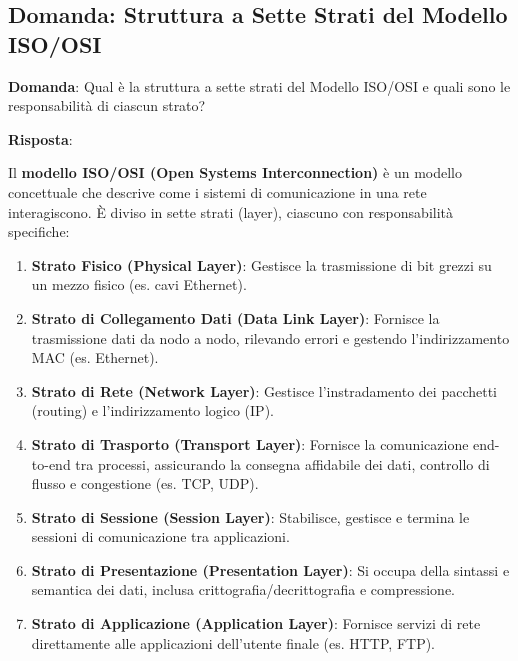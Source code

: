 
\subsection*{Domanda: Struttura a Sette Strati del Modello ISO/OSI}

\textbf{Domanda}: Qual è la struttura a sette strati del Modello ISO/OSI e quali sono le responsabilità di ciascun strato?

\textbf{Risposta}:

Il \textbf{modello ISO/OSI (Open Systems Interconnection)} è un modello concettuale che descrive come i sistemi di comunicazione in una rete interagiscono. È diviso in sette strati (layer), ciascuno con responsabilità specifiche:
\begin{enumerate}
    \item \textbf{Strato Fisico (Physical Layer)}: Gestisce la trasmissione di bit grezzi su un mezzo fisico (es. cavi Ethernet).
    \item \textbf{Strato di Collegamento Dati (Data Link Layer)}: Fornisce la trasmissione dati da nodo a nodo, rilevando errori e gestendo l'indirizzamento MAC (es. Ethernet).
    \item \textbf{Strato di Rete (Network Layer)}: Gestisce l'instradamento dei pacchetti (routing) e l'indirizzamento logico (IP).
    \item \textbf{Strato di Trasporto (Transport Layer)}: Fornisce la comunicazione end-to-end tra processi, assicurando la consegna affidabile dei dati, controllo di flusso e congestione (es. TCP, UDP).
    \item \textbf{Strato di Sessione (Session Layer)}: Stabilisce, gestisce e termina le sessioni di comunicazione tra applicazioni.
    \item \textbf{Strato di Presentazione (Presentation Layer)}: Si occupa della sintassi e semantica dei dati, inclusa crittografia/decrittografia e compressione.
    \item \textbf{Strato di Applicazione (Application Layer)}: Fornisce servizi di rete direttamente alle applicazioni dell'utente finale (es. HTTP, FTP).
\end{enumerate}
